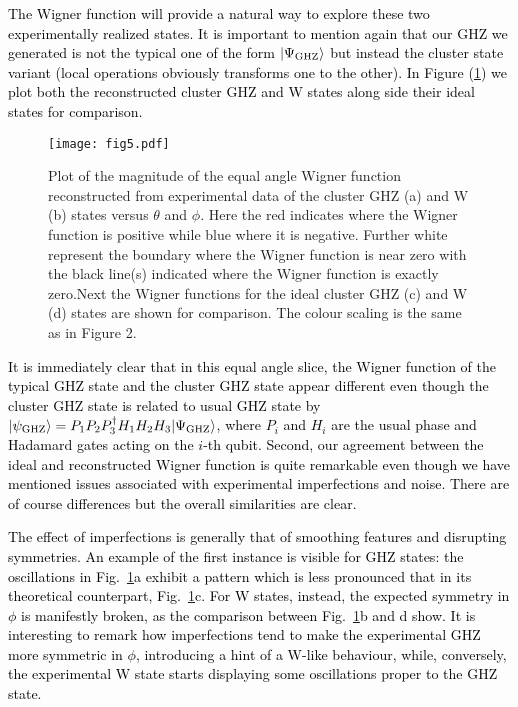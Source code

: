 \documentclass[pra,reprint,showkeys,showpacs,times,superscriptaddress]{revtex4-1}
\def\ket#1{ | #1 \rangle}
\newcommand{\red}{\textcolor{black}}
\begin{document}
\red{The Wigner function will provide a natural way to explore these two experimentally realized states. It is important to mention again that our GHZ we generated is not the typical one of the form $\ket{\Psi_{\rm{GHZ}}}$  but instead the cluster state variant (local operations obviously transforms one to the other). In Figure (\ref{TheGHZandWAexp}) we plot both the reconstructed cluster GHZ and W states along side their ideal states for comparison.}
\begin{figure}[htb]
\begin{center}
{\texttt{[image: fig5.pdf]}}
\end{center}
\caption{Plot of the magnitude of the equal angle Wigner function reconstructed from experimental data of the cluster GHZ (a) and W (b) states versus $\theta$ and $\phi$. Here the red indicates where the Wigner function is positive while blue where it is negative. Further white represent the boundary where the Wigner function is near zero with the black line(s) indicated where the Wigner function is exactly zero.Next the Wigner functions for the ideal  cluster GHZ (c) and W (d) states are shown for comparison. The colour scaling is the same as in Figure 2. }
\label{TheGHZandWAexp} 
\end{figure}
\red{It is immediately clear that in this equal angle slice, the Wigner function of the typical GHZ state and the cluster GHZ state appear different even though the cluster GHZ state is related to usual GHZ state by $\ket{\psi_{\rm{GHZ}}} = P_1 P_2 P_3^\dagger H_1 H_2 H_3\ket{\Psi_{\rm{GHZ}}}$, where $P_i$ and $H_i$ are the usual phase and Hadamard gates acting on the $i$-th qubit. Second, our agreement between the ideal and reconstructed Wigner function is quite remarkable even though we have mentioned issues associated with experimental imperfections and noise. There are of course differences but the overall similarities are clear. }  

\red{The effect of imperfections is generally that of smoothing features and disrupting symmetries. An example of the first instance is visible for GHZ states: the oscillations in Fig.~\ref{TheGHZandWAexp}a exhibit a pattern which is less pronounced that in its theoretical counterpart, Fig.~\ref{TheGHZandWAexp}c. For W states, instead, the expected symmetry in $\phi$ is manifestly broken, as the comparison between Fig.~\ref{TheGHZandWAexp}b and d show. It is interesting to remark how imperfections tend to make the experimental GHZ more symmetric in $\phi$, introducing a hint of a W-like behaviour, while, conversely, the experimental W state starts displaying some oscillations proper to the GHZ state.}
\end{document}
